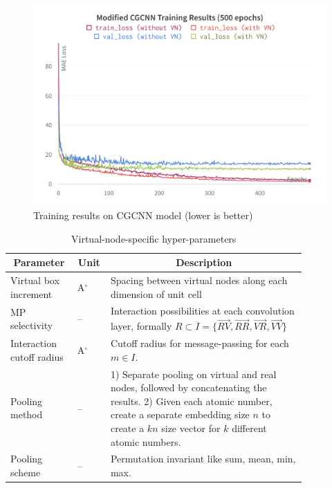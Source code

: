 \documentclass{lxaiproposal}
\begin{document}
\begin{figure}[h]
    \centering
    \includegraphics[width=0.9\linewidth]{result-plots-wandb.png}
    \caption{Training results on CGCNN model (lower is better)}
    \label{plot:prelim-results}
\end{figure}

\begin{table}[h]
        {\scriptsize\begin{tabularx}{\linewidth}{p{0.2\linewidth} p{0.05\linewidth} p{0.6\linewidth}}
            \toprule
            \multicolumn{1}{c}{\textbf{Parameter}} & \multicolumn{1}{c}{\textbf{Unit}} & \multicolumn{1}{c}{\textbf{Description}} \\
            \midrule
            Virtual box increment & A$^\circ$ & Spacing between virtual nodes along each dimension of unit cell \\
            MP selectivity & -- & Interaction possibilities at each convolution layer, formally $R\subset I = \{\vec{RV},\vec{RR},\vec{VR},\vec{VV}\}$\\
            Interaction cutoff radius & A$^\circ$ & Cutoff radius for message-passing for each $m\in I$.\\
            Pooling method & -- &  1) Separate pooling on virtual and real nodes, followed by concatenating the results. 2) Given each atomic number, create a separate embedding size $n$ to create a $kn$ size vector for $k$ different atomic numbers.\\
            Pooling scheme & -- & Permutation invariant like sum, mean, min, max.\\
            \bottomrule
        \end{tabularx}}
        \caption{Virtual-node-specific hyper-parameters}
        \label{table:vn-hparam}
\end{table}
\end{document}
